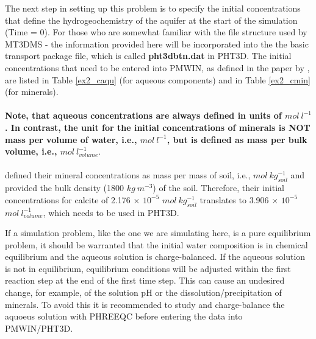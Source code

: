The next step in setting up this problem is to specify the initial concentrations
that define the hydrogeochemistry of the aquifer at the start of the simulation (Time = 0).
For those who are somewhat familiar with the file structure used by MT3DMS -
the information provided here will be incorporated into the 
the basic transport package file, which is called  {\color{red} \textbf{pht3dbtn.dat}}
in PHT3D. The initial concentrations that need to be entered into PMWIN,
as defined in the paper by \cite{enges92}, are listed in
Table \ref{ex2_caqu} (for aqueous components) and in Table \ref{ex2_cmin} (for minerals).
\\
\ \\
\textbf{Note, that aqueous concentrations are always defined in units of $mol\ l^{-1}$.
In contrast, the unit for the initial concentrations of minerals
is NOT mass per volume of water, i.e., $mol\ l^{-1}$,
but is defined as mass per bulk volume, i.e., $mol\ l^{-1}_{volume}$}. \\
\ \\
\cite{enges92} defined their mineral concentrations as mass per
mass of soil, i.e., $mol\ kg_{soil}^{-1}$ and provided the bulk
density (1800 $kg\ m^{-3}$) of the soil. Therefore, their initial
concentrations for calcite of 2.176 $\times$ $10^{-5}$ $mol\
kg_{soil}^{-1}$ translates to 3.906 $\times$ $10^{-5}$ $mol\
l^{-1}_{volume}$, which needs to be used in PHT3D.
\par If a simulation problem, like the one we are 
simulating here, is a pure equilibrium problem, it should
be warranted that the initial water composition is in chemical equilibrium
and the aqueous solution is charge-balanced. 
If the aqueous solution is not in equilibrium, equilibrium conditions
will be adjusted within the first reaction step at the end of the
first time step. This can cause an undesired change, for example,
of the solution pH or the dissolution/precipitation of minerals. 
To avoid this it is recommended to study and
charge-balance the aquoeus solution with PHREEQC before entering
the data into PMWIN/PHT3D.


